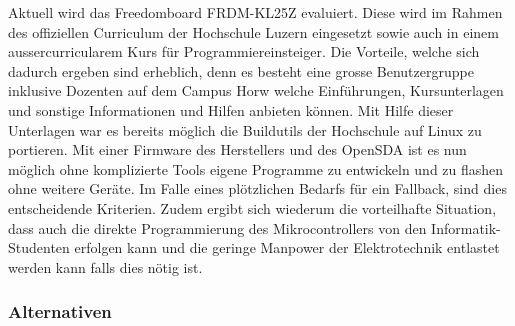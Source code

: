 Aktuell wird das Freedomboard FRDM-KL25Z evaluiert. Diese wird im Rahmen
des offiziellen Curriculum der Hochschule Luzern eingesetzt sowie auch
in einem aussercurricularem Kurs für Programmiereinsteiger. Die Vorteile,
welche sich dadurch ergeben sind erheblich, denn es besteht eine grosse
Benutzergruppe inklusive Dozenten auf dem Campus Horw welche Einführungen,
Kursunterlagen und sonstige Informationen und Hilfen anbieten können. Mit
Hilfe dieser Unterlagen war es bereits möglich die Buildutils der 
Hochschule auf Linux zu portieren. Mit einer Firmware des Herstellers und 
des OpenSDA ist es nun möglich ohne komplizierte Tools eigene Programme zu 
entwickeln und zu flashen ohne weitere Geräte. Im Falle eines plötzlichen 
Bedarfs für ein Fallback, sind dies entscheidende Kriterien. Zudem ergibt
sich wiederum die vorteilhafte Situation, dass auch die direkte 
Programmierung des Mikrocontrollers von den Informatik-Studenten erfolgen
kann und die geringe Manpower der Elektrotechnik entlastet werden kann
falls dies nötig ist.

\subsubsection{Alternativen}
